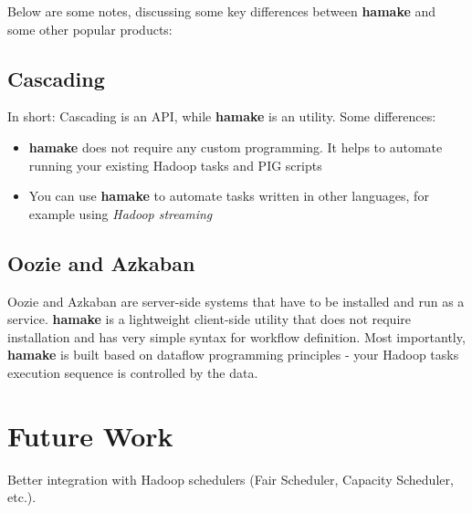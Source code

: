 \documentclass{article}
\begin{document}
Below are some notes, discussing some key differences between \textbf{hamake}
and some other popular products:

\subsection{Cascading}

In short: Cascading is an API, while \textbf{hamake} is an utility. Some differences:
\begin{itemize}
\item \textbf{hamake} does not require any custom programming. It helps to automate running your existing Hadoop tasks and PIG scripts
\item You can use \textbf{hamake} to automate tasks written in other languages, for example using \textit{Hadoop streaming}
\end{itemize}

\subsection{Oozie and Azkaban}

Oozie and Azkaban are server-side systems that have to be installed
and run as a service. \textbf{hamake} is a lightweight client-side utility that
does not require installation and has very simple syntax for workflow
definition.  Most importantly, \textbf{hamake} is built based on dataflow
programming principles - your Hadoop tasks execution sequence is
controlled by the data.
 

\section{Future Work}

Better integration with Hadoop schedulers (Fair Scheduler, Capacity
Scheduler, etc.).

\nocite{*}


\end{document}
